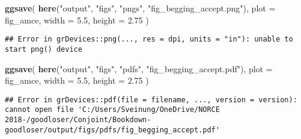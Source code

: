 \documentclass[]{book}
\newenvironment{Shaded}{\begin{snugshade}}{\end{snugshade}}
\newcommand{\KeywordTok}[1]{\textcolor[rgb]{0.13,0.29,0.53}{\textbf{#1}}}
\newcommand{\DataTypeTok}[1]{\textcolor[rgb]{0.13,0.29,0.53}{#1}}
\newcommand{\FloatTok}[1]{\textcolor[rgb]{0.00,0.00,0.81}{#1}}
\newcommand{\StringTok}[1]{\textcolor[rgb]{0.31,0.60,0.02}{#1}}
\newcommand{\NormalTok}[1]{#1}
\begin{document}
\begin{Shaded}
\begin{Highlighting}[]
\KeywordTok{ggsave}\NormalTok{(}
  \KeywordTok{here}\NormalTok{(}\StringTok{"output"}\NormalTok{, }\StringTok{"figs"}\NormalTok{, }\StringTok{"pngs"}\NormalTok{, }\StringTok{"fig_begging_accept.png"}\NormalTok{),}
  \DataTypeTok{plot =}\NormalTok{ fig_amce,}
  \DataTypeTok{width =} \FloatTok{5.5}\NormalTok{, }\DataTypeTok{height =} \FloatTok{2.75}
\NormalTok{)}
\end{Highlighting}
\end{Shaded}

\begin{verbatim}
## Error in grDevices::png(..., res = dpi, units = "in"): unable to start png() device
\end{verbatim}

\begin{Shaded}
\begin{Highlighting}[]
\KeywordTok{ggsave}\NormalTok{(}
  \KeywordTok{here}\NormalTok{(}\StringTok{"output"}\NormalTok{, }\StringTok{"figs"}\NormalTok{, }\StringTok{"pdfs"}\NormalTok{, }\StringTok{"fig_begging_accept.pdf"}\NormalTok{),}
  \DataTypeTok{plot =}\NormalTok{ fig_amce,}
  \DataTypeTok{width =} \FloatTok{5.5}\NormalTok{, }\DataTypeTok{height =} \FloatTok{2.75}
\NormalTok{)}
\end{Highlighting}
\end{Shaded}

\begin{verbatim}
## Error in grDevices::pdf(file = filename, ..., version = version): cannot open file 'C:/Users/Sveinung/OneDrive/NORCE 2018-/goodloser/Conjoint/Bookdown-goodloser/output/figs/pdfs/fig_begging_accept.pdf'
\end{verbatim}
\end{document}
